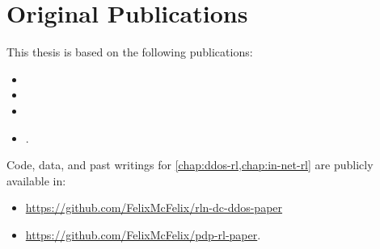 \chapter*{Original Publications}

This thesis is based on the following publications:
{
\renewcommand*{\mkbibnamefamily}[1]{\textsc{#1}}
\renewcommand*{\mkbibnameprefix}[1]{\textsc{#1}}
\begin{itemize}
	\item {}
	\item {}
	\item {}
	\item {}.
\end{itemize}
}

Code, data, and past writings for \cref{chap:ddos-rl,chap:in-net-rl} are publicly available in:
\begin{itemize}
	\item \url{https://github.com/FelixMcFelix/rln-dc-ddos-paper}
	\item \url{https://github.com/FelixMcFelix/pdp-rl-paper}.
\end{itemize}